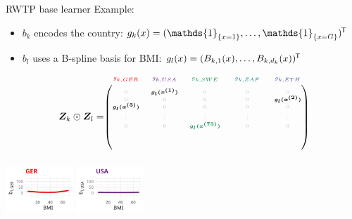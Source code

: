 \documentclass[t,10pt]{beamer}
\begin{document}
\begin{frame}{RWTP base learner}
  Example:
  \begin{itemize}
    \item $b_k$ encodes the country: $g_k(x) = (\mathds{1}_{\{x = 1\}}, \dots, \mathds{1}_{\{x = G\}})^\tran$
    \item $b_l$ uses a B-spline basis for BMI: $g_l(x) = (B_{k,1}(x), \dots, B_{k,d_k}(x))^{\mkern-1.5mu\mathsf{T}}$
  \end{itemize}
  $$
    \design_k \odot \design_l = \tiny\begin{blockarray}{ccccc}
      \color[HTML]{EE0000}g_{k,GER} & \color[HTML]{631879}g_{k,USA} & \color[HTML]{008B45}g_{k,SWE} & \color[HTML]{008280}g_{k,ZAF} & \color[HTML]{3B4992}g_{k,ETH}\\
    \begin{block}{(ccccc)}
      \phantom{x}\\
      \color{lightgray}0 & \color{black}\bm{g_l(x^{(1)})} & \color{lightgray}0 & \color{lightgray}0 & \color{lightgray}0 \\
      \color{lightgray}0 & \color{lightgray}0 & \color{lightgray}0 & \color{lightgray}0 & \color{black}\bm{g_l(x^{(2)})} \\
      \color{black}\bm{g_l(x^{(3)})} & \color{lightgray}0 & \color{lightgray}0 & \color{lightgray}0 & \color{lightgray}0 \\
      \color{lightgray}\vdots & \color{lightgray}\vdots & \color{lightgray}\vdots & \color{lightgray}\vdots & \color{lightgray}\vdots \\
      \color{lightgray}0 & \color{lightgray}0 & \color[HTML]{008B45}\bm{g_l(x^{(73)})} & \color{lightgray}0 & \color{lightgray}0 \\
      \color{white}0 & \color{white}0 & \color{white}0 & \color{white}\bm{g_l(x^{(74)})} & \color{white}0 \\
      \color{white}0 & \color{white}0 & \color{white}\bm{g_l(x^{(75)})} & \color{white}0 & \color{white}0 \\
      \phantom{x}\\
    \end{block}
  \end{blockarray}
  $$
  \normalsize
  {\includegraphics[width=0.19\textwidth]{figures/bs-tensor/fig-tensor-GER.png}}
  {\includegraphics[width=0.19\textwidth]{figures/bs-tensor/fig-tensor-USA.png}}

\end{frame}
\end{document}
